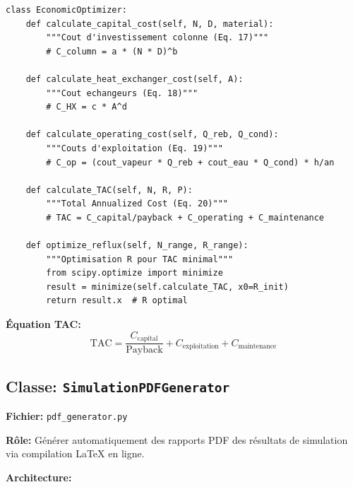 \documentclass[11pt,a4paper]{article}
\begin{document}
\begin{lstlisting}
class EconomicOptimizer:
    def calculate_capital_cost(self, N, D, material):
        """Cout d'investissement colonne (Eq. 17)"""
        # C_column = a * (N * D)^b

    def calculate_heat_exchanger_cost(self, A):
        """Cout echangeurs (Eq. 18)"""
        # C_HX = c * A^d

    def calculate_operating_cost(self, Q_reb, Q_cond):
        """Couts d'exploitation (Eq. 19)"""
        # C_op = (cout_vapeur * Q_reb + cout_eau * Q_cond) * h/an

    def calculate_TAC(self, N, R, P):
        """Total Annualized Cost (Eq. 20)"""
        # TAC = C_capital/payback + C_operating + C_maintenance

    def optimize_reflux(self, N_range, R_range):
        """Optimisation R pour TAC minimal"""
        from scipy.optimize import minimize
        result = minimize(self.calculate_TAC, x0=R_init)
        return result.x  # R optimal
\end{lstlisting}

\textbf{Équation TAC:}
\begin{equation}
\text{TAC} = \frac{C_{\text{capital}}}{\text{Payback}} + C_{\text{exploitation}} + C_{\text{maintenance}}
\end{equation}

\subsection{Classe: \texttt{SimulationPDFGenerator}}

\textbf{Fichier:} \texttt{pdf\_generator.py}

\textbf{Rôle:} Générer automatiquement des rapports PDF des résultats de simulation via compilation LaTeX en ligne.

\textbf{Architecture:}
\end{document}
